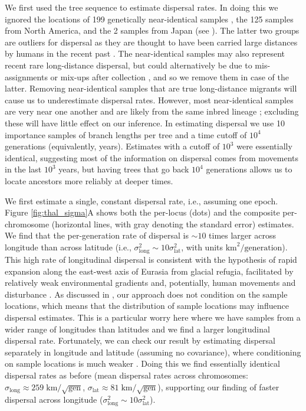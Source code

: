 \documentclass[12pt]{article}
\begin{document}
We first used the tree sequence to estimate dispersal rates. 
In doing this we ignored the locations of 199 genetically near-identical samples \citep[$<10^3$ basepairs different, as in][]{alonso2016}, the 125 samples from North America, and the 2 samples from Japan (see ).
The latter two groups are outliers for dispersal as they are thought to have been carried large distances by humans in the recent past \citep{exposito2018rate,zou2017adaptation}. 
The near-identical samples may also represent recent rare long-distance dispersal, but could alternatively be due to mis-assignments or mix-ups after collection \citep{alonso2016}, and so we remove them in case of the latter. 
Removing near-identical samples that are true long-distance migrants will cause us to underestimate dispersal rates.
However, most near-identical samples are very near one another and are likely from the same inbred lineage \citep{alonso2016}; excluding these will have little effect on our inference.
In estimating dispersal we use 10 importance samples of branch lengths per tree and a time cutoff of $10^4$ generations (equivalently, years).
Estimates with a cutoff of $10^3$ were essentially identical, suggesting most of the information on dispersal comes from movements in the last $10^3$  years, but having trees that go back $10^4$ generations allows us to locate ancestors more reliably at deeper times.
    
We first estimate a single, constant dispersal rate, i.e., assuming one epoch.
Figure \ref{fig:thal_sigma}A shows both the per-locus (dots) and the composite per-chromosome (horizontal lines, with gray denoting the standard error) estimates.
We find that the per-generation rate of dispersal is $\sim10$ times larger across longitude than across latitude (i.e., $\sigma_\mathrm{long}^2 \sim 10 \sigma_\mathrm{lat}^2$, with units $\mathrm{km}^2/\mathrm{generation}$). 
This high rate of longitudinal dispersal is consistent with the hypothesis of rapid expansion along the east-west axis of Eurasia from glacial refugia, facilitated by relatively weak environmental gradients and, potentially, human movements and disturbance \citep{alonso2016,lee2017post}.
{As discussed in , our approach does not condition on the sample locations, which means that the distribution of sample locations may influence dispersal estimates.
This is a particular worry here where we have samples from a wider range of longitudes than latitudes and we find a larger longitudinal dispersal rate.
Fortunately, we can check our result by estimating dispersal separately in longitude and latitude (assuming no covariance), where conditioning on sample locations is much weaker \citep{meligkotsidou2007postprocessing}.
Doing this we find essentially identical dispersal rates as before (mean dispersal rates across chromosomes: $\sigma_\mathrm{long}\approx259\;\mathrm{km}/\sqrt{\mathrm{gen}}$, $\sigma_\mathrm{lat}\approx81\;\mathrm{km}/\sqrt{\mathrm{gen}}$), supporting our finding of faster dispersal across longitude ($\sigma_\mathrm{long}^2 \sim 10 \sigma_\mathrm{lat}^2$).}
\end{document}
